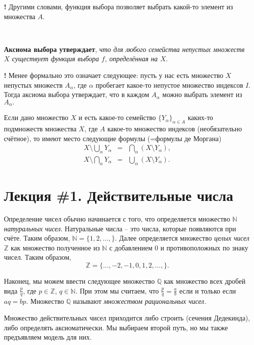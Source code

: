 \begin{mydanger}{\bf{!}}
Другими словами, функция выбора позволяет выбрать какой-то элемент из множества $A.$
\end{mydanger}~

\textbf{Аксиома выбора утверждает},\label{AC}
 \textit{что для любого семейства непустых множеств $X$ существует функция выбора $f$, определённая на $X$}.\\

\begin{mydanger}{\bf{!}}
 Менее формально это означает следующее: пусть у нас есть множество $X$ непустых множеств $A_\alpha$, где $\alpha$ пробегает какое-то непустое множество индексов $I.$ Тогда аксиома выбора утверждает, что в каждом $A_\alpha$ можно выбрать элемент из $A_\alpha.$
\end{mydanger}

Если дано множество $X$ и есть какое-то семейство $\{Y_\alpha\}_{\alpha \in A}$ каких-то подмножеств множества $X$, где $A$ какое-то множество индексов (необязательно счётное), то имеют место следующие формулы (=формулы де Моргана)
\begin{eqnarray}
    X \setminus \bigcup_\alpha Y_\alpha &=& \bigcap_\alpha (X \setminus Y_\alpha), \label{dM1}\\
    X \setminus \bigcap_\alpha Y_\alpha &=& \bigcup_\alpha (X \setminus Y_\alpha). \label{dM2}
\end{eqnarray}


\section{Лекция \#1. Действительные числа}

Определение чисел обычно начинается с того, что определяется множество $\mathbb{N}$ \textit{натуральных чисел}. Натуральные числа -- это числа, которые появляются при счёте. Таким образом, $\mathbb{N} = \{1,2,\ldots,\}$. Далее определяется множество \textit{целых чисел} $\mathbb{Z}$ как множество полученное из $\mathbb{N}$ с добавлением $0$ и противоположных по знаку чисел. Таким образом,
\[
\mathbb{Z} = \{\ldots, -2,-1,0,1,2,\ldots,\}.
\]

Наконец, мы можем ввести следующее множество $\mathbb{Q}$ как множество всех дробей вида $\frac{p}{q}$, где $p\in\mathbb{Z}$, $q \in \mathbb{N}$. При этом мы считаем, что $\frac{p}{q} = \frac{a}{b}$ если и только если $aq = bp$. Множество $\mathbb{Q}$ называют \textit{множеством рациональных чисел.}

Множество действительных чисел приходится либо строить (сечения Дедекинда), либо определять аксиоматически. Мы выбираем второй путь, но мы также предъявляем модель для них.

